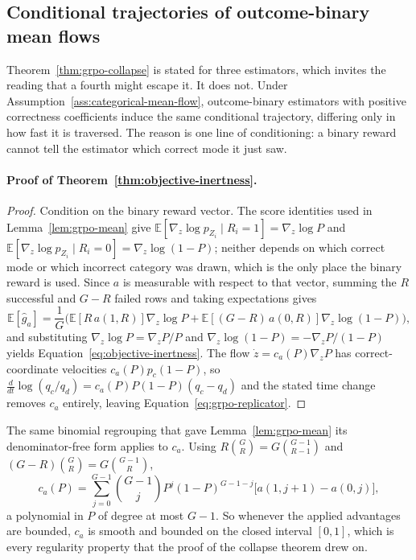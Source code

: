 \documentclass{article}
\newcommand{\1}{\mathbf 1}
\newcommand{\E}{\mathbb E}
\theoremstyle{remark}
\theoremstyle{definition}
\theoremstyle{plain}
\begin{document}
\subsection{Conditional trajectories of outcome-binary mean flows}
\label{app:theory-objective-inertness}

Theorem~\ref{thm:grpo-collapse} is stated for three estimators, which invites
the reading that a fourth might escape it. It does not. Under
Assumption~\ref{ass:categorical-mean-flow}, outcome-binary estimators with
positive correctness coefficients induce the same conditional trajectory,
differing only in how fast it is traversed. The
reason is one line of conditioning: a binary reward cannot tell the estimator
which correct mode it just saw.

\paragraph{Proof of Theorem~\ref{thm:objective-inertness}.}

\begin{proof}
Condition on the binary reward vector. The score identities used in
Lemma~\ref{lem:grpo-mean} give
$\E[\nabla_z\log p_{Z_i}\mid R_i=1]=\nabla_z\log P$ and
$\E[\nabla_z\log p_{Z_i}\mid R_i=0]=\nabla_z\log(1-P)$; neither depends on
which correct mode or which incorrect category was drawn, which is the only
place the binary reward is used. Since $a$ is measurable with respect to that
vector, summing the $R$ successful and $G-R$ failed rows and taking
expectations gives
\[
  \E[\widehat g_a]
  =\frac1G\Big(\E[R\,a(1,R)]\nabla_z\log P
   +\E[(G-R)\,a(0,R)]\nabla_z\log(1-P)\Big),
\]
and substituting $\nabla_z\log P=\nabla_zP/P$ and
$\nabla_z\log(1-P)=-\nabla_zP/(1-P)$ yields
Equation~\eqref{eq:objective-inertness}. The flow
$\dot z=c_a(P)\nabla_zP$ has correct-coordinate velocities
$c_a(P)p_c(1-P)$, so $\frac{d}{dt}\log(q_c/q_d)=c_a(P)P(1-P)(q_c-q_d)$ and the
stated time change removes $c_a$ entirely, leaving
Equation~\eqref{eq:grpo-replicator}.
\end{proof}


The same binomial regrouping that gave Lemma~\ref{lem:grpo-mean} its
denominator-free form applies to $c_a$. Using $R\binom GR=G\binom{G-1}{R-1}$
and $(G-R)\binom GR=G\binom{G-1}{R}$,
\begin{equation}
 c_a(P)=\sum_{j=0}^{G-1}\binom{G-1}{j}P^j(1-P)^{G-1-j}
 \big[a(1,j+1)-a(0,j)\big],
 \label{eq:inertness-polynomial}
\end{equation}
a polynomial in $P$ of degree at most $G-1$. So whenever the applied advantages
are bounded, $c_a$ is smooth and bounded on the closed interval $[0,1]$, which
is every regularity property that the proof of the collapse theorem drew on.
\end{document}
